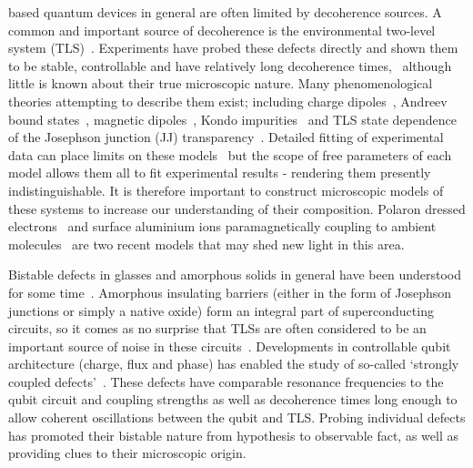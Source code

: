  based quantum devices in general are often limited by decoherence sources.
A common and important source of decoherence is the environmental two-level system (TLS)~\cite{Dutta1981, Shnirman2005}.
Experiments have probed these defects directly and shown them to be stable, controllable and have relatively long decoherence times,~\cite{Simmonds2004, Neeley2008, Shalibo2010, Lupascu2009, Lisenfeld2010, Gunnarsson2013} although little is known about their true microscopic nature.
Many phenomenological theories attempting to describe them exist; including charge dipoles~\cite{Martinis2005}, Andreev bound states~\cite{DeSousa2009}, magnetic dipoles~\cite{Sendelbach2008}, Kondo impurities~\cite{Faoro2007} and TLS state dependence of the Josephson junction (JJ) transparency~\cite{Ku2005}.
Detailed fitting of experimental data can place limits on these models~\cite{Cole2010} but the scope of free parameters of each model allows them all to fit experimental results - rendering them presently indistinguishable.
It is therefore important to construct microscopic models of these systems to increase our understanding of their composition.
Polaron dressed electrons~\cite{Agarwal2013} and surface aluminium ions paramagnetically coupling to ambient molecules~\cite{Lee2014} are two recent models that may shed new light in this area.

Bistable defects in glasses and amorphous solids in general have been understood for some time~\cite{Anderson1972}.
Amorphous insulating barriers (either in the form of Josephson junctions or simply a native oxide) form an integral part of superconducting circuits, so it comes as no surprise that TLSs are often considered to be an important source of noise in these circuits~\cite{Dutta1981, Shnirman2005, Martinis2005}.
Developments in controllable qubit architecture (charge, flux and phase) has enabled the study of so-called `strongly coupled defects'~\cite{Neeley2008, Lupascu2009, Lisenfeld2010}.
These defects have comparable resonance frequencies to the qubit circuit and coupling strengths as well as decoherence times long enough to allow coherent oscillations between the qubit and TLS.
Probing individual defects has promoted their bistable nature from hypothesis to observable fact, as well as providing clues to their microscopic origin.

